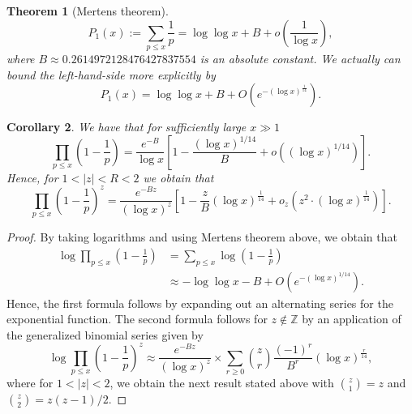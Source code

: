 \documentclass[11pt,reqno,a4letter]{article}
\numberwithin{figure}{section}
\numberwithin{table}{section}
\theoremstyle{plain}
\newtheorem{theorem}{Theorem}
\newtheorem{cor}[theorem]{Corollary}
\numberwithin{theorem}{section}
\theoremstyle{definition}
\begin{document}
\begin{theorem}[Mertens theorem]
\label{theorem_Mertens_theorem}  
\[
P_1(x) := \sum_{p \leq x} \frac{1}{p} = \log\log x + B + o\left(\frac{1}{\log x}\right), 
\]
where $B \approx 0.2614972128476427837554$ is an absolute constant. We actually can bound the 
left-hand-side more explicitly by 
\[
P_1(x) = \log\log x + B + O\left(e^{-(\log x)^{\frac{1}{14}}}\right). 
\]
\end{theorem} 

\begin{cor}
\label{lemma_Gz_productTermV2} 
We have that for sufficiently large $x \gg 1$ 
\[
\prod_{p \leq x} \left(1 - \frac{1}{p}\right) = \frac{e^{-B}}{\log x}\left[ 
     1 - \frac{(\log x)^{1/14}}{B} + o\left((\log x)^{1/14}\right)\right]. 
\]
Hence, for $1 < |z| < R < 2$ we obtain that 
\[
\prod_{p \leq x} \left(1 - \frac{1}{p}\right)^{z} = \frac{e^{-Bz}}{(\log x)^{z}} \left[ 
     1 - \frac{z}{B} (\log x)^{\frac{1}{14}} + o_z\left(z^2 \cdot (\log x)^{\frac{1}{14}}\right)\right]. 
\]
\end{cor} 
\begin{proof} 
By taking logarithms and using Mertens theorem above, we obtain that 
\begin{align*} 
\log \prod_{p \leq x} \left(1-\frac{1}{p}\right) & = \sum_{p \leq x} \log\left(1-\frac{1}{p}\right) \\ 
     & \approx -\log\log x - B +O\left(e^{-(\log x)^{1/14}}\right). 
\end{align*} 
Hence, the first formula follows by expanding out an alternating series for the exponential 
function. The second formula follows for $z \notin \mathbb{Z}$ by an application of the 
generalized binomial series given by 
\[
\log \prod_{p \leq x} \left(1-\frac{1}{p}\right)^{z} \approx \frac{e^{-Bz}}{(\log x)^{z}} \times 
     \sum_{r \geq 0} \binom{z}{r} \frac{(-1)^r}{B^r} (\log x)^{\frac{r}{14}}, 
\]
where for $1 < |z| < 2$, we obtain the next result stated above with 
$\binom{z}{1} = z$ and $\binom{z}{2} = z(z-1) / 2$. 
\end{proof} 
\end{document}

